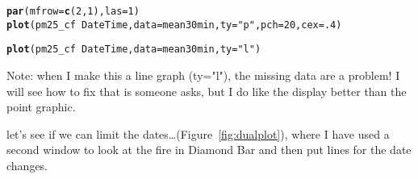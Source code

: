 \documentclass{article}\usepackage[]{graphicx}\usepackage[]{xcolor}
\makeatletter
\newcommand{\hlnum}[1]{\textcolor[rgb]{0.686,0.059,0.569}{#1}}%
\newcommand{\hlstr}[1]{\textcolor[rgb]{0.192,0.494,0.8}{#1}}%
\newcommand{\hlopt}[1]{\textcolor[rgb]{0,0,0}{#1}}%
\newcommand{\hlstd}[1]{\textcolor[rgb]{0.345,0.345,0.345}{#1}}%
\newcommand{\hlkwc}[1]{\textcolor[rgb]{0.333,0.667,0.333}{#1}}%
\newcommand{\hlkwd}[1]{\textcolor[rgb]{0.737,0.353,0.396}{\textbf{#1}}}%
\newenvironment{kframe}{%
 \def\at@end@of@kframe{}%
 \ifinner\ifhmode%
  \def\at@end@of@kframe{\end{minipage}}%
  \begin{minipage}{\columnwidth}%
 \fi\fi%
 \def\FrameCommand##1{\hskip\@totalleftmargin \hskip-\fboxsep
 \colorbox{shadecolor}{##1}\hskip-\fboxsep
     \hskip-\linewidth \hskip-\@totalleftmargin \hskip\columnwidth}%
 \MakeFramed {\advance\hsize-\width
   \@totalleftmargin\z@ \linewidth\hsize
   \@setminipage}}%
 {\par\unskip\endMakeFramed%
 \at@end@of@kframe}
\newenvironment{knitrout}{}{} %
\makeatother
\begin{document}
\begin{knitrout}
\color{fgcolor}\begin{kframe}
\begin{alltt}
\hlkwd{par}\hlstd{(}\hlkwc{mfrow}\hlstd{=}\hlkwd{c}\hlstd{(}\hlnum{2}\hlstd{,}\hlnum{1}\hlstd{),} \hlkwc{las}\hlstd{=}\hlnum{1}\hlstd{)}
\hlkwd{plot}\hlstd{(pm25_cf} \hlopt{~} \hlstd{DateTime,} \hlkwc{data}\hlstd{=mean30min,} \hlkwc{ty}\hlstd{=}\hlstr{"p"}\hlstd{,} \hlkwc{pch}\hlstd{=}\hlnum{20}\hlstd{,} \hlkwc{cex}\hlstd{=}\hlnum{.4}\hlstd{)}
\end{alltt}


{\ttfamily\noindent\bfseries\color{errorcolor}{\#\# Error in eval(m\$data, eframe): object 'mean30min' not found}}\begin{alltt}
\hlkwd{plot}\hlstd{(pm25_cf} \hlopt{~} \hlstd{DateTime,} \hlkwc{data}\hlstd{=mean30min,} \hlkwc{ty}\hlstd{=}\hlstr{"l"}\hlstd{)}
\end{alltt}


{\ttfamily\noindent\bfseries\color{errorcolor}{\#\# Error in eval(m\$data, eframe): object 'mean30min' not found}}\end{kframe}
\end{knitrout}

Note: when I make this a line graph (ty="l"), the missing data are a problem!  I will see how to fix that is someone asks, but I do like the display better than the point graphic.

let's see if we can limit the dates\ldots (Figure~\ref{fig:dualplot}), where I have used a second window to look at the fire in Diamond Bar and then put lines for the date changes. 
\end{document}
